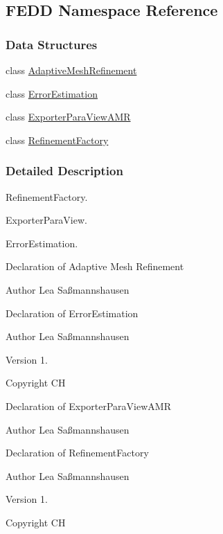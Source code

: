 \hypertarget{namespaceFEDD}{}\subsection{F\+E\+DD Namespace Reference}
\label{namespaceFEDD}
\subsubsection*{Data Structures}
\begin{DoxyCompactItemize}
\item 
class \hyperlink{classFEDD_1_1AdaptiveMeshRefinement}{Adaptive\+Mesh\+Refinement}
\item 
class \hyperlink{classFEDD_1_1ErrorEstimation}{Error\+Estimation}
\item 
class \hyperlink{classFEDD_1_1ExporterParaViewAMR}{Exporter\+Para\+View\+A\+MR}
\item 
class \hyperlink{classFEDD_1_1RefinementFactory}{Refinement\+Factory}
\end{DoxyCompactItemize}


\subsubsection{Detailed Description}
Refinement\+Factory.

Exporter\+Para\+View.

Error\+Estimation.

Declaration of Adaptive Mesh Refinement

\begin{DoxyAuthor}{Author}
Lea Saßmannshausen
\end{DoxyAuthor}
Declaration of Error\+Estimation

\begin{DoxyAuthor}{Author}
Lea Saßmannshausen 
\end{DoxyAuthor}
\begin{DoxyVersion}{Version}
1. 
\end{DoxyVersion}
\begin{DoxyCopyright}{Copyright}
CH
\end{DoxyCopyright}
Declaration of Exporter\+Para\+View\+A\+MR

\begin{DoxyAuthor}{Author}
Lea Saßmannshausen
\end{DoxyAuthor}
Declaration of Refinement\+Factory

\begin{DoxyAuthor}{Author}
Lea Saßmannshausen 
\end{DoxyAuthor}
\begin{DoxyVersion}{Version}
1. 
\end{DoxyVersion}
\begin{DoxyCopyright}{Copyright}
CH 
\end{DoxyCopyright}
